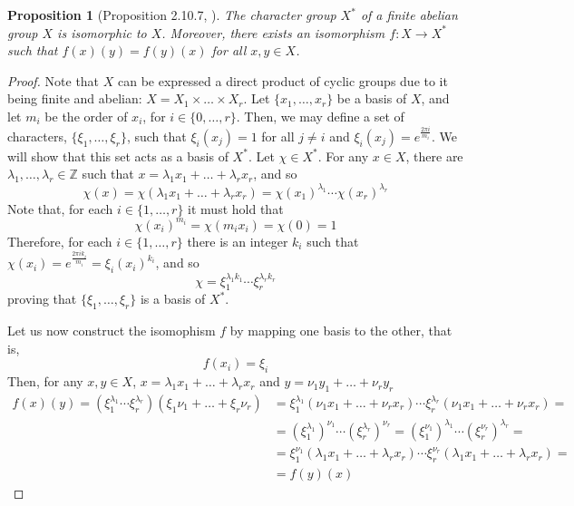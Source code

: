 \documentclass[a4paper,12pt]{article}
\theoremstyle{plain}
\newtheorem{proposition}[theorem]{Proposition}
\theoremstyle{definition}
\theoremstyle{remark}
\begin{document}
\begin{proposition}[Proposition 2.10.7, \cite{brouwer_distance-regular_1989}]
    The character group $ X^* $ of a finite abelian group $ X $ is isomorphic
    to $ X $. Moreover, there exists an isomorphism $ f : X \rightarrow X^* $
    such that $ f(x)(y) = f(y)(x) $ for all $ x,y \in X $.
    \label{prop:char_isomorph}
\end{proposition}
\begin{proof}
    Note that $ X $ can be expressed a direct product of cyclic groups due to
    it being finite and abelian: $ X = X_1 \times \dots \times X_r $. Let
    $ \{ x_1, \dots, x_r \} $ be a basis of $ X $, and let $ m_i $ be the order
    of $ x_i $, for $ i \in \{ 0,\dots,r\} $. Then, we may define a set of
    characters, $ \{ \xi_1, \dots, \xi_r \} $, such that $ \xi_i(x_j) = 1 $ for
    all $ j \neq i $ and $ \xi_i (x_j) = e^{\frac{2\pi i}{m_i}} $. We will show
    that this set acts as a basis of $ X^* $. Let $ \chi \in X^* $. For
    any $ x \in X $, there are $ \lambda_1, \dots, \lambda_r \in \mathbb{Z} $
    such that $ x = \lambda_1 x_1 + \dots + \lambda_r x_r $, and so
    \[ \chi(x) = \chi(\lambda_1 x_1 + \dots +\lambda_rx_r) =
    \chi(x_1)^{\lambda_1} \cdots  \chi(x_r)^{\lambda_r} \]
    Note that, for each $ i \in \{ 1,\dots,r \} $ it must hold that
    \[ \chi(x_i)^{m_i} = \chi(m_ix_i) = \chi(0) = 1 \]
    Therefore, for each $ i \in \{ 1,\dots,r \} $ there is an integer $ k_i $
    such that $ \chi(x_i) = e^{\frac{2\pi i k_i}{m_i}} = \xi_i(x_i)^{k_i} $,
    and so
    \[ \chi = \xi_1^{\lambda_1 k_1} \cdots \xi_r^{\lambda_r k_r} \]
    proving that $ \{ \xi_1, \dots, \xi_r \} $ is a basis of $ X^* $.

    Let us now construct the isomophism $ f $ by mapping one basis to the other,
    that is,
    \[ f(x_i) = \xi_i \]
    Then, for any $ x,y \in X $, $ x = \lambda_1 x_1 + \dots + \lambda_r x_r $
    and $ y = \nu_1 y_1 + \dots + \nu_r y_r $
    \begin{equation*}
        \begin{split}
        f(x)(y) =
        (\xi_1^{\lambda_1} \cdots \xi_r^{\lambda_r}) (\xi_1\nu_1 + \dots + \xi_r\nu_r)
        &= \xi_1^{\lambda_1} (\nu_1x_1 + \dots + \nu_rx_r) \cdots
        \xi_r^{\lambda_r} (\nu_1x_1 + \dots + \nu_rx_r) = \\
        &= (\xi_1^{\lambda_1})^{\nu_1} \cdots (\xi_r^{\lambda_r})^{\nu_r}
        = (\xi_1^{\nu_1})^{\lambda_1} \cdots (\xi_r^{\nu_r})^{\lambda_r} = \\
        &= \xi_1^{\nu_1} (\lambda_1x_1 + \dots + \lambda_rx_r) \cdots
        \xi_r^{\nu_r} (\lambda_1x_1 + \dots + \lambda_rx_r) = \\
        &= f(y)(x)
        \end{split}
    \end{equation*}
\end{proof}
\end{document}
